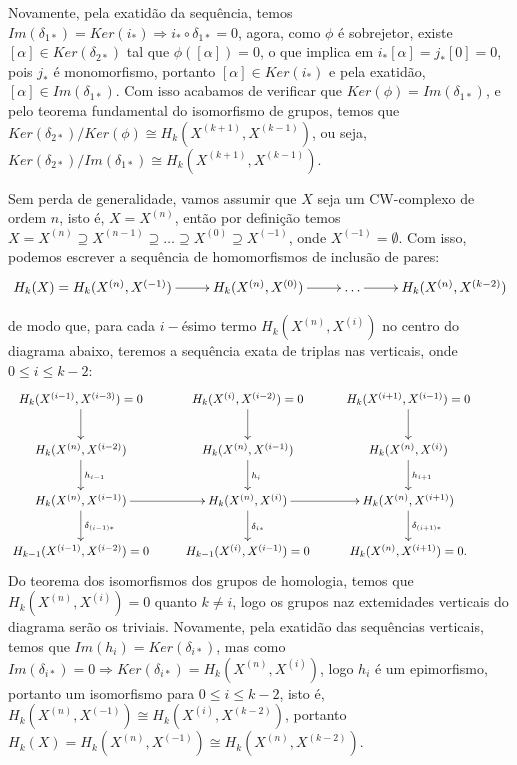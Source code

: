 \documentclass[12pt]{book}
\newcommand{\classe}[1]{[#1]}
\newcommand{\skeleton}[1]{X^{(#1)}}
\newcommand{\homologia}[2]{H_{#1}(#2)}
\newcommand{\homologiarel}[3]{H_{#1}(#2,#3)}
\newcommand{\homologiarelskele}[3]{H_{#1}(X^{(#2)}, X^{(#3)})}
\begin{document}
{	\vspace{2mm} Novamente, pela exatidão da sequência, temos $Im(\delta_{1*}) = Ker(i_{*}) \Rightarrow i_{*}\circ\delta_{1*}=0$, agora, como $\phi$ é sobrejetor, existe $\classe{\alpha} \in Ker(\delta_{2*})$ tal que $\phi(\classe{\alpha}) = 0$, o que implica em $i_{*}{\classe{\alpha}} = j_{*}\classe{0} = 0$, pois $j_{*}$ é monomorfismo, portanto $\classe{\alpha} \in Ker(i_{*})$ e pela exatidão, $\classe{\alpha} \in Im(\delta_{1*})$. Com isso acabamos de verificar que $Ker(\phi) = Im(\delta_{1*})$, e pelo teorema fundamental do isomorfismo de grupos, temos que $Ker(\delta_{2*})/Ker(\phi) \cong \homologiarelskele{k}{k+1}{k-1}$, ou seja, $Ker(\delta_{2*})/Im(\delta_{1*}) \cong \homologiarelskele{k}{k+1}{k-1}$.
	
	\vspace{2mm} Sem perda de generalidade, vamos assumir que $X$ seja um CW-complexo de ordem $n$, isto é, $X= \skeleton{n}$, então por definição temos $X= \skeleton{n} \supseteq \skeleton{n-1} \supseteq \dots \supseteq \skeleton{0} \supseteq \skeleton{-1}$, onde $\skeleton{-1} = \emptyset$. Com isso, podemos escrever a sequência de homomorfismos de inclusão de pares:
	\[
	\xymatrix{
		\homologia{k}{X} = \homologiarel{k}{\skeleton{n}}{\skeleton{-1}}\ar[r]& \homologiarel{k}{\skeleton{n}}{\skeleton{0}} \ar[r] & \dots \ar[r] & \homologiarel{k}{\skeleton{n}}{\skeleton{k-2}}
	}
	\]
	
	de modo que, para cada $i-$ésimo termo $\homologiarelskele{k}{n}{i}$ no centro do diagrama abaixo, teremos a sequência exata de triplas nas verticais, onde $0\leq i\leq k-2$:
	\[
	\xymatrix{
		\homologiarel{k}{\skeleton{i-1}}{\skeleton{i-3}}=0 \ar[d] & \homologiarel{k}{\skeleton{i}}{\skeleton{i-2}}=0 \ar[d] & \homologiarel{k}{\skeleton{i+1}}{\skeleton{i-1}}=0 \ar[d] &	
		\\
		\homologiarel{k}{\skeleton{n}}{\skeleton{i-2}} \ar[d]^{h_{i-1}} & \homologiarel{k}{\skeleton{n}}{\skeleton{i-1}} \ar[d]^{h_{i}} & \homologiarel{k}{\skeleton{n}}{\skeleton{i}} \ar[d]^{h_{i+1}}
		\\
		\homologiarel{k}{\skeleton{n}}{\skeleton{i-1}} \ar[r]\ar[d]^{\delta_{(i-1)*}}& \homologiarel{k}{\skeleton{n}}{\skeleton{i}} \ar[r] \ar[d]^{\delta_{i*}} &  \homologiarel{k}{\skeleton{n}}{\skeleton{i+1}} \ar[d]^{\delta_{(i+1)*}} 
		\\
		\homologiarelskele{k-1}{i-1}{i-2}=0& \homologiarel{k-1}{\skeleton{i}}{\skeleton{i-1}}=0 &  \homologiarel{k}{\skeleton{n}}{\skeleton{i+1}}=0. &		
	}
	\]
	Do teorema dos isomorfismos dos grupos de homologia, temos que $\homologiarelskele{k}{n}{i} =0$ quanto $k \neq i$, logo os grupos naz extemidades verticais do diagrama serão os triviais. Novamente, pela exatidão das sequências verticais, temos que $Im(h_{i}) = Ker(\delta_{i*})$, mas como $Im(\delta_{i*}) = 0 \Rightarrow Ker(\delta_{i*}) = \homologiarel{k}{\skeleton{n}}{\skeleton{i}}$, logo $h_{i}$ é um epimorfismo, portanto um isomorfismo para $0\leq i \leq k-2$, isto é, $\homologiarel{k}{\skeleton{n}}{\skeleton{-1}} \cong \homologiarel{k}{\skeleton{i}}{\skeleton{k-2}}$, portanto $\homologia{k}{X} = \homologiarel{k}{\skeleton{n}}{\skeleton{-1}} \cong \homologiarel{k}{\skeleton{n}}{\skeleton{k-2}}$.
	
}
\end{document}
